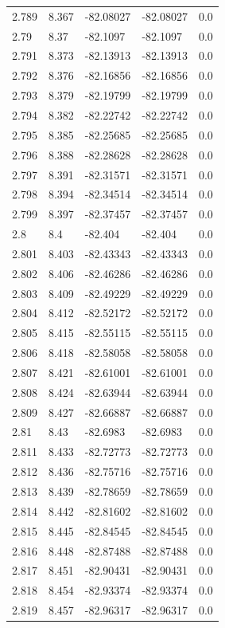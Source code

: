 \begin{tabular}{lllll}
2.789 & 8.367 & -82.08027 & -82.08027 & 0.0 \\
2.79 & 8.37 & -82.1097 & -82.1097 & 0.0 \\
2.791 & 8.373 & -82.13913 & -82.13913 & 0.0 \\
2.792 & 8.376 & -82.16856 & -82.16856 & 0.0 \\
2.793 & 8.379 & -82.19799 & -82.19799 & 0.0 \\
2.794 & 8.382 & -82.22742 & -82.22742 & 0.0 \\
2.795 & 8.385 & -82.25685 & -82.25685 & 0.0 \\
2.796 & 8.388 & -82.28628 & -82.28628 & 0.0 \\
2.797 & 8.391 & -82.31571 & -82.31571 & 0.0 \\
2.798 & 8.394 & -82.34514 & -82.34514 & 0.0 \\
2.799 & 8.397 & -82.37457 & -82.37457 & 0.0 \\
2.8 & 8.4 & -82.404 & -82.404 & 0.0 \\
2.801 & 8.403 & -82.43343 & -82.43343 & 0.0 \\
2.802 & 8.406 & -82.46286 & -82.46286 & 0.0 \\
2.803 & 8.409 & -82.49229 & -82.49229 & 0.0 \\
2.804 & 8.412 & -82.52172 & -82.52172 & 0.0 \\
2.805 & 8.415 & -82.55115 & -82.55115 & 0.0 \\
2.806 & 8.418 & -82.58058 & -82.58058 & 0.0 \\
2.807 & 8.421 & -82.61001 & -82.61001 & 0.0 \\
2.808 & 8.424 & -82.63944 & -82.63944 & 0.0 \\
2.809 & 8.427 & -82.66887 & -82.66887 & 0.0 \\
2.81 & 8.43 & -82.6983 & -82.6983 & 0.0 \\
2.811 & 8.433 & -82.72773 & -82.72773 & 0.0 \\
2.812 & 8.436 & -82.75716 & -82.75716 & 0.0 \\
2.813 & 8.439 & -82.78659 & -82.78659 & 0.0 \\
2.814 & 8.442 & -82.81602 & -82.81602 & 0.0 \\
2.815 & 8.445 & -82.84545 & -82.84545 & 0.0 \\
2.816 & 8.448 & -82.87488 & -82.87488 & 0.0 \\
2.817 & 8.451 & -82.90431 & -82.90431 & 0.0 \\
2.818 & 8.454 & -82.93374 & -82.93374 & 0.0 \\
2.819 & 8.457 & -82.96317 & -82.96317 & 0.0 \\

\end{tabular}
